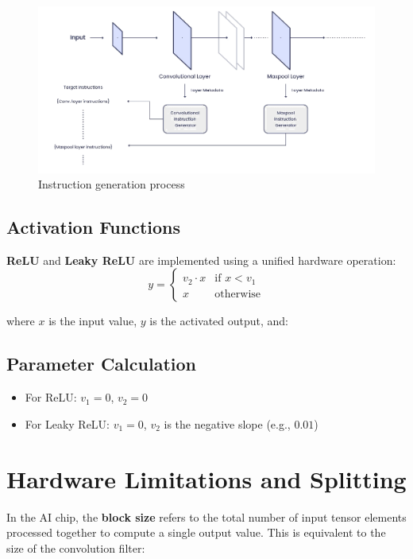 \documentclass[12pt]{report}
\begin{document}
\begin{figure}[!b]
    \centering
    \includegraphics[width=\textwidth]{instruction_generation1.png}
    \caption{Instruction generation process}
    \label{label2}
\end{figure}

\subsection{Activation Functions}


\textbf{ReLU} and \textbf{Leaky ReLU} are implemented using a unified hardware operation:
\[
    y =
    \begin{cases}
        v_2 \cdot x & \text{if } x < v_1 \\
        x           & \text{otherwise}
    \end{cases}
\]

\noindent
where $x$ is the input value, $y$ is the activated output, and:
\subsection*{Parameter Calculation}
\begin{itemize}
    \item For ReLU: $v_1 = 0$, $v_2 = 0$
    \item For Leaky ReLU: $v_1 = 0$, $v_2$ is the negative slope (e.g., $0.01$)
\end{itemize}

\section{Hardware Limitations and Splitting}

In the AI chip, the \textbf{block size} refers to the total number of input tensor elements processed together to compute a single output value. This is equivalent to the size of the convolution filter:
\end{document}
